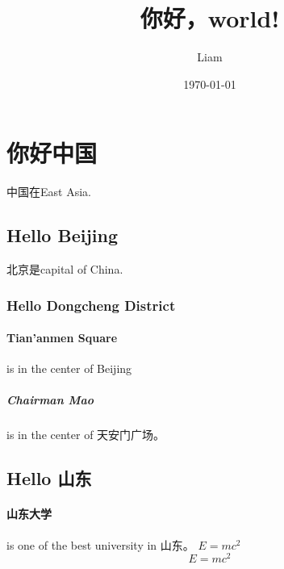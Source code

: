 \documentclass[UTF8]{ctexart}
\title{你好，world!}
\author{Liam}
\date{\today}
\begin{document}
\maketitle
\tableofcontents
\section{你好中国}
中国在East Asia.
\subsection{Hello Beijing}
北京是capital of China.
\subsubsection{Hello Dongcheng District}
\paragraph{Tian'anmen Square}
is in the center of Beijing
\subparagraph{Chairman Mao}
is in the center of 天安门广场。
\subsection{Hello 山东}
\paragraph{山东大学} is one of the best university in 山东。
$E=mc^2$
\[E=mc^2\]
\end{document}
